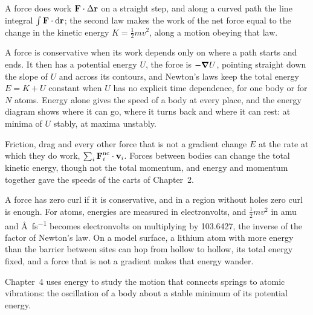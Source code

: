 
A force does work $\bm{\mathrm{F}}\cdot\Delta\bm{\mathrm{r}}$ on a straight step, and along
a curved path the line integral $\int\bm{\mathrm{F}}\cdot\mathrm{d}\bm{\mathrm{r}}$; the second
law makes the work of the net force equal to the change in the kinetic
energy $K = \frac12 mv^2$, along a motion obeying that law.

A force is
conservative when its work depends only on where a path starts and ends.
It then has a potential energy $U$, the force is $-\bm{\nabla} U$, pointing
straight down the slope of $U$ and across its contours, and Newton's laws
keep the total energy $E = K + U$ constant when $U$ has no explicit time
dependence, for one body or for $N$ atoms.
Energy alone gives the speed of a body at every place, and the energy
diagram shows where it can go, where it turns back and where it can rest:
at minima of $U$ stably, at maxima unstably.

Friction, drag and every other
force that is not a gradient change $E$ at the rate at which they do work,
$\sum_i\bm{\mathrm{F}}_i^{\mathrm{nc}}\cdot\bm{\mathrm{v}}_i$. Forces between bodies can
change the total kinetic energy, though not the total momentum, and
energy and momentum together gave the speeds of the carts of Chapter~2.

A force has zero curl if it is conservative, and in a region without holes
zero curl is enough. For atoms, energies are measured in electronvolts,
and $\frac12 mv^2$ in amu and \si{\angstrom\per\femto\second} becomes
electronvolts on multiplying by \num{103.6427}, the inverse of the factor
of Newton's law. On a model surface, a lithium atom with more energy than
the barrier between sites can hop from hollow to hollow, its total energy
fixed, and a force that is not a gradient makes that energy wander.

Chapter~4 uses energy to study the motion that connects springs to atomic vibrations: the
oscillation of a body about a stable minimum of its potential energy.

